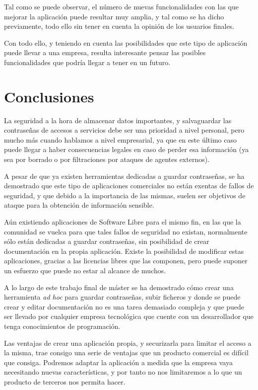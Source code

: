\documentclass{\ClassPath/viu-tfm-template}
\begin{document}
Tal como se puede observar, el número de nuevas funcionalidades con las que mejorar la aplicación puede resultar muy amplia, y tal como se ha dicho previamente, todo ello sin tener en cuenta la opinión de los usuarios finales.

Con todo ello, y teniendo en cuenta las posibilidades que este tipo de aplicación puede llevar a una empresa, resulta interesante pensar las posibles funcionalidades que podría llegar a tener en un futuro.



\vfill
\pagebreak
\chapter{Conclusiones}

La seguridad a la hora de almacenar datos importantes, y salvaguardar las contraseñas de accesos a servicios debe ser una prioridad a nivel personal, pero mucho más cuando hablamos a nivel empresarial, ya que en este último caso puede llegar a haber consecuencias legales en caso de perder esa información (ya sea por borrado o por filtraciones por ataques de agentes externos).

A pesar de que ya existen herramientas dedicadas a guardar contraseñas, se ha demostrado que este tipo de aplicaciones comerciales no están exentas de fallos de seguridad, y que debido a la importancia de las mismas, suelen ser objetivos de ataque para la obtención de información sensible.

Aún existiendo aplicaciones de Software Libre para el mismo fin, en las que la comunidad se vuelca para que tales fallos de seguridad no existan, normalmente sólo están dedicadas a guardar contraseñas, sin posibilidad de crear documentación en la propia aplicación. Existe la posibilidad de modificar estas aplicaciones, gracias a las licencias libres que las componen, pero puede suponer un esfuerzo que puede no estar al alcance de muchos.


A lo largo de este trabajo final de máster se ha demostrado cómo crear una herramienta \textit{ad hoc} para guardar contraseñas, subir ficheros y donde se puede crear y editar documentación no es una tarea demasiado compleja y que puede ser llevado por cualquier empresa tecnológica que cuente con un desarrollador que tenga conocimientos de programación.

Las ventajas de crear una aplicación propia, y securizarla para limitar el acceso a la misma, trae consigo una serie de ventajas que un producto comercial es difícil que consiga. Podremos adaptar la aplicación a medida que la empresa vaya necesitando nuevas características, y por tanto no nos limitaremos a lo que un producto de terceros nos permita hacer.
\end{document}
